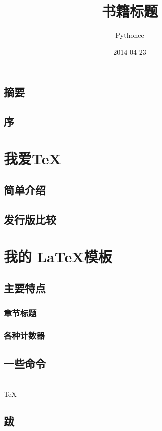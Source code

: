 \documentclass[fancyhdr,adobefonts,oneside,hyperref,openany,a4paper,UTF8]{ctexbook}
\author{Pythonee}
\title{书籍标题}
\date{2014-04-23}
\begin{document}
\maketitle


\frontmatter
\tableofcontents
\listoftables
\listoffigures
\setcounter{page}{0}
\chapter{摘要}
\lipsum[1]
\chapter{序}
\lipsum[1]


\mainmatter
\part{我爱\TeX}
\chapter{简单介绍}
\lipsum

\chapter{发行版比较}
\lipsum

\part{我的 \LaTeX 模板}
\chapter{主要特点}
\section{章节标题}
\lipsum
\section{各种计数器}
\lipsum

\chapter{一些命令}
\cpp \\
\TeX \cite{knuth,lamport}

\backmatter
\chapter{跋}
\lipsum[1]

\appendix



\end{document}
